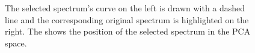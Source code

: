 \begin{figure}[h]
\begin{tabular}{ c  c }
  \end{tabular}
  \vspace{0.3cm}
  \caption{The selected spectrum's curve on the left is drawn with a dashed line and the corresponding original spectrum is highlighted on the right. The  shows the position of the selected spectrum in the PCA space.}
\end{figure}
